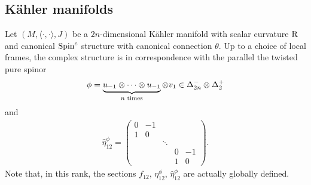 \documentclass[10pt,a4paper]{amsart}
\numberwithin{equation}{section}
\begin{document}
\subsection{K\"ahler manifolds}
Let $(M,\langle \cdot,\cdot\rangle , J)$ be a $2n$-dimensional K\"ahler manifold with scalar curvature ${\rm R}$ and canonical ${\rm Spin}^c$ structure with canonical connection $\theta$. Up to a choice of local frames, the complex structure is in correspondence with the parallel the twisted pure spinor
\begin{gather*}\phi=\underbrace{u_{-1}\otimes\cdots \otimes u_{-1}}_{n\,\, {\rm times}}\otimes v_{1}\in \Delta_{2n}^-\otimes \Delta_2^+\end{gather*}
and
\begin{gather*}
 \hat\eta_{12}^{\phi} = \left(\begin{matrix}
 0 & -1 & & & \\
 1 & 0 & & & \\
 & & \ddots & & \\
 & & & 0 & -1 \\
 & & & 1 & 0
 \end{matrix} \right).
\end{gather*}
Note that, in this rank, the sections $f_{12}$, $\eta_{12}^\phi$, $\hat\eta_{12}^\phi$ are actually globally defined.
\end{document}
